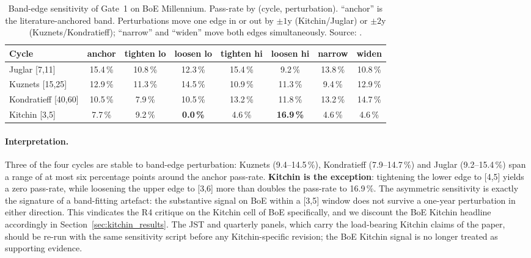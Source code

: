 \begin{table}[h]
\centering
\caption{Band-edge sensitivity of Gate~1 on BoE Millennium.
Pass-rate by (cycle, perturbation). ``anchor'' is the
literature-anchored band. Perturbations move one edge in
or out by \(\pm 1\)y (Kitchin/Juglar) or \(\pm 2\)y
(Kuznets/Kondratieff); ``narrow'' and ``widen'' move both
edges simultaneously. Source:
.}
\label{tab:band_sensitivity_boe}
\small
\begin{tabularx}{\linewidth}{@{}X c c c c c c c@{}}
\toprule
\textbf{Cycle} & \textbf{anchor} & \textbf{tighten lo} & \textbf{loosen lo} & \textbf{tighten hi} & \textbf{loosen hi} & \textbf{narrow} & \textbf{widen} \\
\midrule
Juglar [7,11]      & 15.4\,\% & 10.8\,\% & 12.3\,\% & 15.4\,\% &  9.2\,\% & 13.8\,\% & 10.8\,\% \\
Kuznets [15,25]    & 12.9\,\% & 11.3\,\% & 14.5\,\% & 10.9\,\% & 11.3\,\% &  9.4\,\% & 12.9\,\% \\
Kondratieff [40,60] & 10.5\,\% &  7.9\,\% & 10.5\,\% & 13.2\,\% & 11.8\,\% & 13.2\,\% & 14.7\,\% \\
Kitchin [3,5]      &  7.7\,\% &  9.2\,\% &  \textbf{0.0\,\%} &  4.6\,\% & \textbf{16.9\,\%} &  4.6\,\% &  4.6\,\% \\
\bottomrule
\end{tabularx}
\end{table}

\paragraph{Interpretation.}
Three of the four cycles are stable to band-edge
perturbation: Kuznets (9.4--14.5\,\%), Kondratieff
(7.9--14.7\,\%) and Juglar (9.2--15.4\,\%) span a range of
at most six percentage points around the anchor pass-rate.
\textbf{Kitchin is the exception}: tightening the lower
edge to [4,5] yields a zero pass-rate, while loosening the
upper edge to [3,6] more than doubles the pass-rate to
16.9\,\%. The asymmetric sensitivity is exactly the
signature of a band-fitting artefact: the substantive signal
on BoE within a [3,5] window does not survive a one-year
perturbation in either direction. This vindicates the R4
critique on the Kitchin cell of BoE specifically, and we
discount the BoE Kitchin headline accordingly in
Section~\ref{sec:kitchin_results}. The JST and quarterly
panels, which carry the load-bearing Kitchin claims of the
paper, should be re-run with the same sensitivity script
before any Kitchin-specific revision; the BoE Kitchin signal
is no longer treated as supporting evidence.

